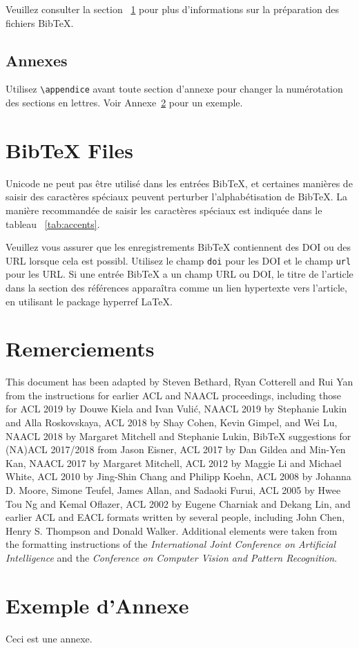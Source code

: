 \documentclass[11pt,french,hyphens]{article}
\begin{document}
Veuillez consulter la section ~\ref{sec:bibtex} pour plus d'informations sur la préparation des fichiers Bib\TeX{}.

\subsection{Annexes}

Utilisez \verb|\appendice| avant toute section d'annexe pour changer la numérotation des sections en lettres. Voir Annexe~\ref{sec:appendix} pour un exemple.

\section{Bib\TeX{} Files}
\label{sec:bibtex}

Unicode ne peut pas être utilisé dans les entrées Bib\TeX{}, et certaines manières de saisir des caractères spéciaux peuvent perturber l'alphabétisation de Bib\TeX. La manière recommandée de saisir les caractères spéciaux est indiquée dans le tableau ~\ref{tab:accents}.

Veuillez vous assurer que les enregistrements Bib\TeX{} contiennent des DOI ou des URL lorsque cela est possibl.
Utilisez le champ \verb|doi| pour les DOI et le champ \verb|url|  pour les URL.
Si une entrée Bib\TeX{} a un champ URL ou DOI, le titre de l'article dans la section des références apparaîtra comme un lien hypertexte vers l'article, en utilisant le package hyperref \LaTeX{}.

\section*{Remerciements}

This document has been adapted
by Steven Bethard, Ryan Cotterell and Rui Yan
from the instructions for earlier ACL and NAACL proceedings, including those for 
ACL 2019 by Douwe Kiela and Ivan Vuli\'{c},
NAACL 2019 by Stephanie Lukin and Alla Roskovskaya, 
ACL 2018 by Shay Cohen, Kevin Gimpel, and Wei Lu, 
NAACL 2018 by Margaret Mitchell and Stephanie Lukin,
Bib\TeX{} suggestions for (NA)ACL 2017/2018 from Jason Eisner,
ACL 2017 by Dan Gildea and Min-Yen Kan, 
NAACL 2017 by Margaret Mitchell, 
ACL 2012 by Maggie Li and Michael White, 
ACL 2010 by Jing-Shin Chang and Philipp Koehn, 
ACL 2008 by Johanna D. Moore, Simone Teufel, James Allan, and Sadaoki Furui, 
ACL 2005 by Hwee Tou Ng and Kemal Oflazer, 
ACL 2002 by Eugene Charniak and Dekang Lin, 
and earlier ACL and EACL formats written by several people, including
John Chen, Henry S. Thompson and Donald Walker.
Additional elements were taken from the formatting instructions of the \emph{International Joint Conference on Artificial Intelligence} and the \emph{Conference on Computer Vision and Pattern Recognition}.



\appendix

\section{Exemple d'Annexe}
\label{sec:appendix}

Ceci est une annexe.
\end{document}
